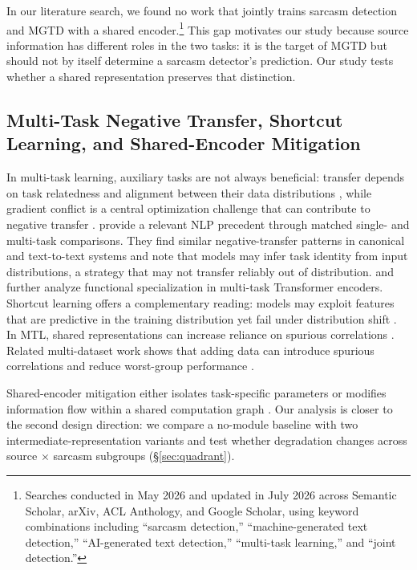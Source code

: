 \documentclass[11pt]{article}
\newcommand{\Sref}[1]{\hyperref[#1]{\S\ref*{#1}}}
\begin{document}
In our literature search, we found no work that jointly trains sarcasm detection and MGTD with a shared encoder.\footnote{Searches conducted in May 2026 and updated in July 2026 across Semantic Scholar, arXiv, ACL Anthology, and Google Scholar, using keyword combinations including ``sarcasm detection,'' ``machine-generated text detection,'' ``AI-generated text detection,'' ``multi-task learning,'' and ``joint detection.''} This gap motivates our study because source information has different roles in the two tasks: it is the target of MGTD but should not by itself determine a sarcasm detector's prediction. Our study tests whether a shared representation preserves that distinction.

\subsection{Multi-Task Negative Transfer, Shortcut Learning, and Shared-Encoder Mitigation}
\label{sec:related-transfer}

In multi-task learning, auxiliary tasks are not always beneficial: transfer depends on task relatedness and alignment between their data distributions \citep{zhang2023survey,wu2020understanding}, while gradient conflict is a central optimization challenge that can contribute to negative transfer \citep{yu2020gradientsurgery,liu2021cagrad}. \citet{mueller2022taskconflict} provide a relevant NLP precedent through matched single- and multi-task comparisons. They find similar negative-transfer patterns in canonical and text-to-text systems and note that models may infer task identity from input distributions, a strategy that may not transfer reliably out of distribution. \citet{he2021stemcell} and \citet{li2023functional} further analyze functional specialization in multi-task Transformer encoders. Shortcut learning offers a complementary reading: models may exploit features that are predictive in the training distribution yet fail under distribution shift \citep{geirhos2020shortcut,ye2024spurious}. In MTL, shared representations can increase reliance on spurious correlations \citep{hu2022spurious,chai2025spurious}. Related multi-dataset work shows that adding data can introduce spurious correlations and reduce worst-group performance \citep{compton2023morisless}.

Shared-encoder mitigation either isolates task-specific parameters \citep{pfeiffer2021adapterfusion,pfeiffer2020madx,mahabadi2021hyperformer,stickland2019pals} or modifies information flow within a shared computation graph \citep{wu2019sifted,pilault2021camtl}. Our analysis is closer to the second design direction: we compare a no-module baseline with two intermediate-representation variants and test whether degradation changes across source $\times$ sarcasm subgroups (\Sref{sec:quadrant}).
\end{document}
